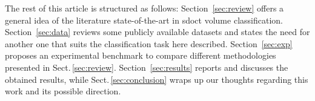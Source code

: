  The rest of this article is structured as follows: Section~\ref{sec:review} offers a general idea of the literature state-of-the-art in \gls{sdoct} volume classification. Section~\ref{sec:data} reviews some publicly available datasets and states the need for another one that suits the classification task here described.
 Section~\ref{sec:exp} proposes an experimental benchmark to compare different methodologies presented in Sect.\,\ref{sec:review}.
 Section~\ref{sec:results} reports and discusses the obtained results, while Sect.\,\ref{sec:conclusion} wraps up our thoughts regarding this work and its possible direction.


